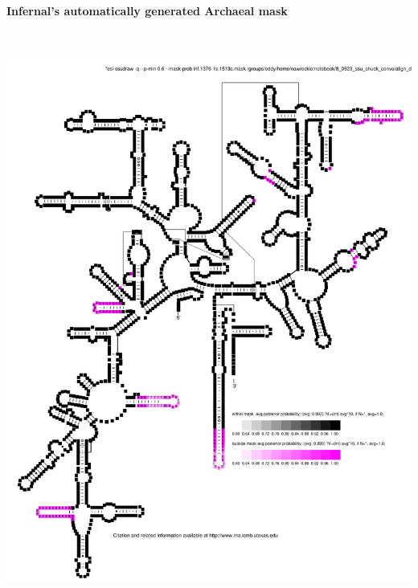 \documentclass[landscape]{slides}
\begin{document}
\begin{slide}
\begin{center}
\textbf{Infernal's automatically generated Archaeal mask}
\end{center}
\small

\begin{center}
\includegraphics[height=7.5in]{figs/inf-lm}

\end{center}
\vfill
\end{slide}
\end{document}
